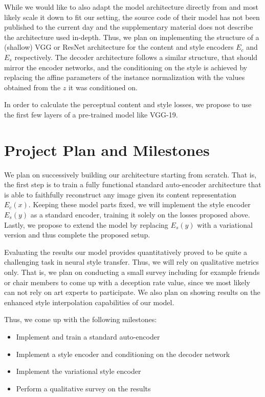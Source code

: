 \documentclass[twoside,twocolumn]{article}
\begin{document}
While we would like to also adapt the model architecture directly from \cite{Kotovenko_2019_ICCV} and most likely scale it down to fit our setting, the source code of their model has not been published to the current day and the supplementary material does not describe the architecture used in-depth. Thus, we plan on implementing the structure of a (shallow) VGG or ResNet architecture for the content and style encoders $E_c$ and $E_s$ respectively. The decoder architecture follows a similar structure, that should mirror the encoder networks, and the conditioning on the style is achieved by replacing the affine parameters of the instance normalization with the values obtained from the $z$ it was conditioned on.

In order to calculate the perceptual content and style losses, we propose to use the first few layers of a pre-trained model like VGG-19.

\section{Project Plan and Milestones}

We plan on successively building our architecture starting from scratch. That is, the first step is to train a fully functional standard auto-encoder architecture that is able to faithfully reconstruct any image given its content representation $E_c(x)$. Keeping these model parts fixed, we will implement the style encoder $E_s(y)$ as a standard encoder, training it solely on the losses proposed above. Lastly, we propose to extend the model by replacing $E_s(y)$ with a variational version and thus complete the proposed setup.

Evaluating the results our model provides quantitatively proved to be quite a challenging task in neural style transfer. Thus, we will rely on qualitative metrics only. That is, we plan on conducting a small survey including for example friends or chair members to come up with a deception rate value, since we most likely can not rely on art experts to  participate. We also plan on showing results on the enhanced style interpolation capabilities of our model.

Thus, we come up with the following milestones:
\begin{itemize}
	\item Implement and train a standard auto-encoder
	\item Implement a style encoder and conditioning on the decoder network
	\item Implement the variational style encoder
	\item Perform a qualitative survey on the results
\end{itemize}
\end{document}
